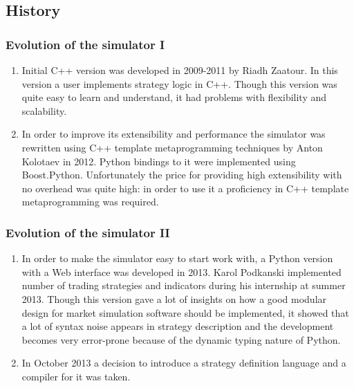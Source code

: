 \documentclass{beamer}
\begin{document}
\subsection{History}
\begin{frame}
\frametitle{Evolution of the simulator I}
\begin{enumerate}
  \item Initial C++ version was developed in 2009-2011 by Riadh Zaatour. In this version a user implements strategy logic in C++. Though this version was quite easy to learn and understand, it had problems with flexibility and scalability.
  \item In order to improve its extensibility and performance the simulator was rewritten using C++ template metaprogramming techniques by Anton Kolotaev in 2012. Python bindings to it were implemented using Boost.Python. Unfortunately the price for providing high extensibility with no overhead was quite high: in order to use it a proficiency in C++ template metaprogramming was required.
\end{enumerate}
\end{frame}
\begin{frame}
\frametitle{Evolution of the simulator II}
\begin{enumerate}
  \item In order to make the simulator easy to start work with, a Python version with a Web interface was developed in 2013. Karol Podkanski implemented number of trading strategies and indicators during his internship at summer 2013. Though this version gave a lot of insights on how a good modular design for market simulation software should be implemented, it showed that a lot of syntax noise appears in strategy description and the development becomes very error-prone because of the dynamic typing nature of Python.
  \item In October 2013 a decision to introduce a strategy definition language and a compiler for it was taken.
\end{enumerate}
\end{frame}
\end{document}
